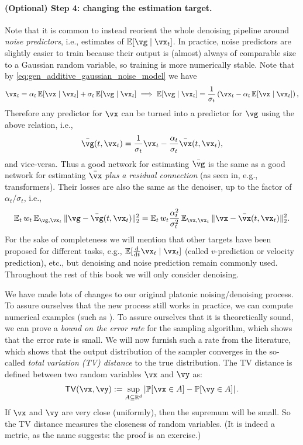 \documentclass[../../book-main.tex]{subfiles}
\begin{document}
\paragraph{(Optional) Step 4: changing the estimation target.} Note that it is common to instead reorient the whole denoising pipeline around \textit{noise predictors}, i.e., estimates of \(\Ex[\vg \mid \vx_{t}]\). In practice, noise predictors are slightly easier to train because their output is (almost) always of comparable size to a Gaussian random variable, so training is more numerically stable. Note that by \eqref{eq:gen_additive_gaussian_noise_model} we have 
\begin{equation}
	\vx_{t} = \alpha_{t}\Ex[\vx \mid \vx_{t}] + \sigma_{t}\Ex[\vg \mid \vx_{t}] \implies \Ex[\vg \mid \vx_{t}] = \frac{1}{\sigma_{t}}\bp{\vx_{t} - \alpha_{t}\Ex[\vx \mid \vx_{t}]},
\end{equation}
Therefore any predictor for \(\vx\) can be turned into a predictor for \(\vg\) using the above relation, i.e.,
\begin{equation}
	\bar{\vg}(t, \vx_{t}) = \frac{1}{\sigma_{t}}\vx_{t} - \frac{\alpha_{t}}{\sigma_{t}}\bar{\vx}(t, \vx_{t}),
\end{equation}
and vice-versa. Thus a good network for estimating \(\bar{\vg}\) is the same as a good network for estimating \(\bar{\vx}\) \textit{plus a residual connection} (as seen in, e.g., transformers). Their losses are also the same as the denoiser, up to the factor of \(\alpha_{t}/\sigma_{t}\), i.e.,
\begin{equation}
	\Ex_{t}w_{t}\Ex_{\vg, \vx_{t}}\norm{\vg - \bar{\vg}(t, \vx_{t})}_{2}^{2} = \Ex_{t}w_{t}\frac{\alpha_{t}^{2}}{\sigma_{t}^{2}}\Ex_{\vx, \vx_{t}}\norm{\vx - \bar{\vx}(t, \vx_{t})}_{2}^{2}.
\end{equation}
For the sake of completeness we will mention that other targets have been proposed for different tasks, e.g., \(\Ex[\odv*{\vx_{t}}{t} \mid \vx_{t}]\) (called \(v\)-prediction or velocity prediction), etc., but denoising and noise prediction remain commonly used. Throughout the rest of this book we will only consider denoising.


We have made lots of changes to our original platonic noising/denoising process. To assure ourselves that the new process still works in practice, we can compute numerical examples (such as ). To assure ourselves that it is theoretically sound, we can prove a \textit{bound on the error rate} for the sampling algorithm, which shows that the error rate is small. We will now furnish such a rate from the literature, which shows that the output distribution of the sampler converges in the so-called \textit{total variation (TV) distance} to the true distribution. The TV distance is defined between two random variables \(\vx\) and \(\vy\) as:
\begin{equation}
	\TV(\vx, \vy) := \sup_{A \subseteq \R^{d}}\abs*{\Pr[\vx \in A] - \Pr[\vy \in A]}.
\end{equation}
If \(\vx\) and \(\vy\) are very close (uniformly), then the supremum will be small. So the TV distance measures the closeness of random variables. (It is indeed a metric, as the name suggests: the proof is an exercise.)
\end{document}
